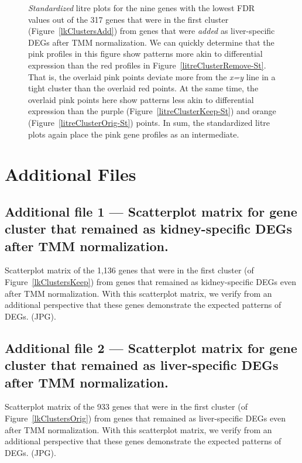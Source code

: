 \documentclass{bmcart}
\begin{document}
\begin{linenumbers}
\begin{backmatter}
\begin{figure}[h!]
\caption{
\textit{Standardized} litre plots for the nine genes with the lowest FDR values out of the 317 genes that were in the first cluster (Figure~\ref{lkClustersAdd}) from genes that were \textit{added} as liver-specific DEGs after TMM normalization. We can quickly determine that the pink profiles in this figure show patterns more akin to differential expression than the red profiles in Figure~\ref{litreClusterRemove-St}. That is, the overlaid pink points deviate more from the \textit{x=y} line in a tight cluster than the overlaid red points. At the same time, the overlaid pink points here show patterns less akin to differential expression than the purple (Figure~\ref{litreClusterKeep-St}) and orange (Figure~\ref{litreClusterOrig-St}) points. In sum, the standardized litre plots again place the pink gene profiles as an intermediate.
\label{litreClusterAdd-St}}
\end{figure}

\clearpage
\section*{Additional Files}

  \subsection*{Additional file 1 --- Scatterplot matrix for gene cluster that remained as kidney-specific DEGs after TMM normalization.}
    Scatterplot matrix of the 1,136 genes that were in the first cluster (of Figure~\ref{lkClustersKeep}) from genes that remained as kidney-specific DEGs even after TMM normalization. With this scatterplot matrix, we verify from an additional perspective that these genes demonstrate the expected patterns of DEGs. (JPG).

  \subsection*{Additional file 2 --- Scatterplot matrix for gene cluster that remained as liver-specific DEGs after TMM normalization.}
    Scatterplot matrix of the 933 genes that were in the first cluster (of Figure~\ref{lkClustersOrig}) from genes that remained as liver-specific DEGs even after TMM normalization. With this scatterplot matrix, we verify from an additional perspective that these genes demonstrate the expected patterns of DEGs. (JPG).


\end{backmatter}
\end{linenumbers}
\end{document}
